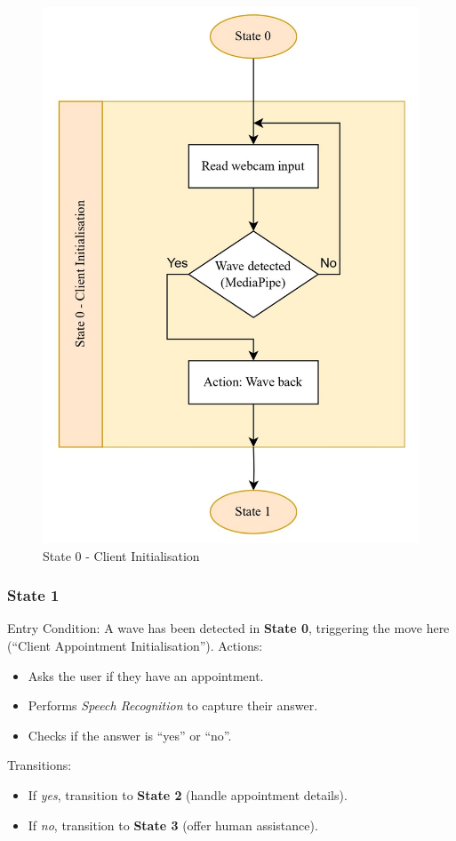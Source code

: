 \documentclass[conference]{IEEEtran}
\begin{document}
\begin{figure}
    \centering
    \includegraphics[width=.6\linewidth]{State 0 - Client Initialisation.jpg}
    \caption{State 0 - Client Initialisation}
    \label{State 0 - Client Initialisation}
\end{figure}

\subsubsection{State 1}
Entry Condition:
A wave has been detected in \textbf{State 0}, triggering the move here (``Client Appointment Initialisation'').
Actions:
\begin{itemize}
  \item Asks the user if they have an appointment.
  \item Performs \emph{Speech Recognition} to capture their answer.
  \item Checks if the answer is ``yes'' or ``no''.
\end{itemize}
Transitions:
\begin{itemize}
  \item If \emph{yes}, transition to \textbf{State 2} (handle appointment details).
  \item If \emph{no}, transition to \textbf{State 3} (offer human assistance).
\end{itemize}
\end{document}
